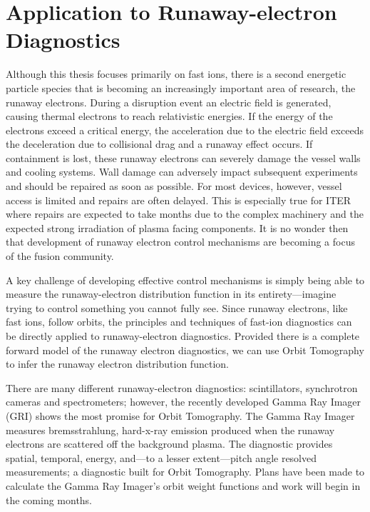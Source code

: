 \section{Application to Runaway-electron Diagnostics}
Although this thesis focuses primarily on fast ions, there is a second energetic particle species that is becoming an increasingly important area of research, the runaway electrons.
During a disruption event an electric field is generated, causing thermal electrons to reach relativistic energies.
If the energy of the electrons exceed a critical energy, the acceleration due to the electric field exceeds the deceleration due to collisional drag and a runaway effect occurs.
If containment is lost, these runaway electrons can severely damage the vessel walls and cooling systems.
Wall damage can adversely impact subsequent experiments and should be repaired as soon as possible.
For most devices, however, vessel access is limited and repairs are often delayed.
This is especially true for ITER where repairs are expected to take months due to the complex machinery and the expected strong irradiation of plasma facing components.\cite{iter1999overview,ikeda2007progress,hender2007mhd,boozer2017runaway}
It is no wonder then that development of runaway electron control mechanisms are becoming a focus of the fusion community.
 
A key challenge of developing effective control mechanisms is simply being able to measure the runaway-electron distribution function in its entirety---imagine trying to control something you cannot fully see.
Since runaway electrons, like fast ions, follow orbits, the principles and techniques of fast-ion diagnostics can be directly applied to runaway-electron diagnostics. Provided there is a complete forward model of the runaway electron diagnostics, we can use Orbit Tomography to infer the runaway electron distribution function. 

There are many different runaway-electron diagnostics: scintillators, synchrotron cameras and spectrometers; however, the recently developed Gamma Ray Imager\cite{paz2017spatiotemporal} (GRI) shows the most promise for Orbit Tomography. The Gamma Ray Imager measures bremsstrahlung, hard-x-ray emission produced when the runaway electrons are scattered off the background plasma.
The diagnostic provides spatial, temporal, energy, and---to a lesser extent---pitch angle resolved measurements; a diagnostic built for Orbit Tomography. Plans have been made to calculate the Gamma Ray Imager's orbit weight functions and work will begin in the coming months.
